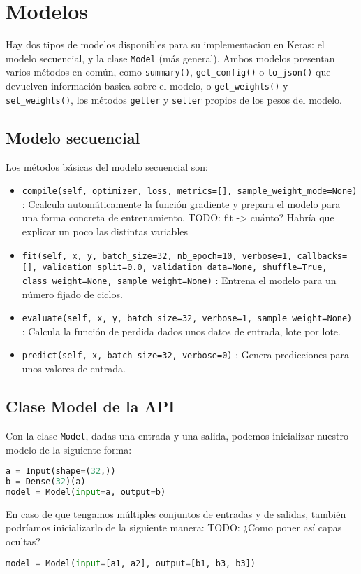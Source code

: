 \section{Modelos}
Hay dos tipos de modelos disponibles para su implementacion en Keras: el modelo secuencial, y la clase \lstinline{Model} (más general). Ambos modelos presentan varios métodos en común, como \lstinline{summary()}, \lstinline{get_config()} o \lstinline{to_json()} que devuelven información basica sobre el modelo, o \lstinline{get_weights()} y \lstinline{set_weights()}, los métodos \lstinline{getter} y \lstinline{setter} propios de los pesos del modelo.
\subsection{Modelo secuencial}
Los métodos básicas del modelo secuencial son:
\begin{itemize}
TODO: comentaría lo de los self; al final son métodos de una clase
\item \lstinline{compile(self, optimizer, loss, metrics=[], sample_weight_mode=None)} : Ccalcula automáticamente la función gradiente y prepara el modelo para una forma concreta de entrenamiento.
TODO: fit -> cuánto? Habría que explicar un poco las distintas variables
\item \lstinline{fit(self, x, y, batch_size=32, nb_epoch=10, verbose=1, callbacks=[], validation_split=0.0, validation_data=None, shuffle=True, class_weight=None, sample_weight=None)} : Entrena el modelo para un número fijado de ciclos.
\item \lstinline{evaluate(self, x, y, batch_size=32, verbose=1, sample_weight=None)} : Calcula la función de perdida dados unos datos de entrada, lote por lote.
\item \lstinline{predict(self, x, batch_size=32, verbose=0)} : Genera predicciones para unos valores de entrada.
\end{itemize}
\subsection{Clase Model de la API}
Con la clase \lstinline{Model}, dadas una entrada y una salida, podemos inicializar nuestro modelo de la siguiente forma:
\begin{lstlisting}[language=Python]
a = Input(shape=(32,))
b = Dense(32)(a)
model = Model(input=a, output=b)
\end{lstlisting}
En caso de que tengamos múltiples conjuntos de entradas y de salidas, también podríamos inicializarlo de la siguiente manera:
TODO: ¿Como poner así capas ocultas?
\begin{lstlisting}[language=Python]
model = Model(input=[a1, a2], output=[b1, b3, b3])
\end{lstlisting}
